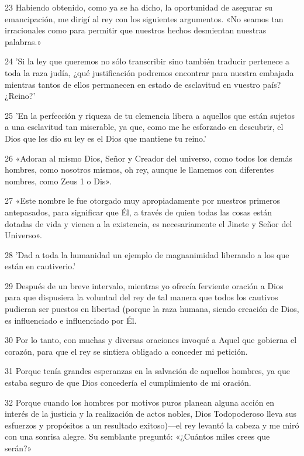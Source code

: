 \par 23 Habiendo obtenido, como ya se ha dicho, la oportunidad de asegurar su emancipación, me dirigí al rey con los siguientes argumentos. «No seamos tan irracionales como para permitir que nuestros hechos desmientan nuestras palabras.»

\par 24 'Si la ley que queremos no sólo transcribir sino también traducir pertenece a toda la raza judía, ¿qué justificación podremos encontrar para nuestra embajada mientras tantos de ellos permanecen en estado de esclavitud en vuestro país? ¿Reino?'

\par 25 'En la perfección y riqueza de tu clemencia libera a aquellos que están sujetos a una esclavitud tan miserable, ya que, como me he esforzado en descubrir, el Dios que les dio su ley es el Dios que mantiene tu reino.'

\par 26 «Adoran al mismo Dios, Señor y Creador del universo, como todos los demás hombres, como nosotros mismos, oh rey, aunque le llamemos con diferentes nombres, como Zeus 1 o Dis».

\par 27 «Este nombre le fue otorgado muy apropiadamente por nuestros primeros antepasados, para significar que Él, a través de quien todas las cosas están dotadas de vida y vienen a la existencia, es necesariamente el Jinete y Señor del Universo».

\par 28 'Dad a toda la humanidad un ejemplo de magnanimidad liberando a los que están en cautiverio.'

\par 29 Después de un breve intervalo, mientras yo ofrecía ferviente oración a Dios para que dispusiera la voluntad del rey de tal manera que todos los cautivos pudieran ser puestos en libertad (porque la raza humana, siendo creación de Dios, es influenciado e influenciado por Él.

\par 30 Por lo tanto, con muchas y diversas oraciones invoqué a Aquel que gobierna el corazón, para que el rey se sintiera obligado a conceder mi petición.

\par 31 Porque tenía grandes esperanzas en la salvación de aquellos hombres, ya que estaba seguro de que Dios concedería el cumplimiento de mi oración.

\par 32 Porque cuando los hombres por motivos puros planean alguna acción en interés de la justicia y la realización de actos nobles, Dios Todopoderoso lleva sus esfuerzos y propósitos a un resultado exitoso)—el rey levantó la cabeza y me miró con una sonrisa alegre. Su semblante preguntó: «¿Cuántos miles crees que serán?»

